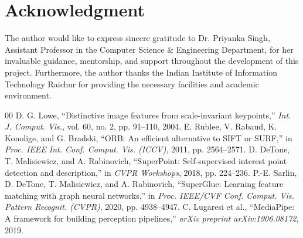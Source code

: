 \documentclass[conference]{IEEEtran}
\begin{document}
\section*{Acknowledgment}
The author would like to express sincere gratitude to Dr. Priyanka Singh, Assistant Professor in the Computer Science \& Engineering Department, for her invaluable guidance, mentorship, and support throughout the development of this project. Furthermore, the author thanks the Indian Institute of Information Technology Raichur for providing the necessary facilities and academic environment.


\begin{thebibliography}{00}
 D. G. Lowe, ``Distinctive image features from scale-invariant keypoints,'' \textit{Int. J. Comput. Vis.}, vol. 60, no. 2, pp. 91--110, 2004.
 E. Rublee, V. Rabaud, K. Konolige, and G. Bradski, ``ORB: An efficient alternative to SIFT or SURF,'' in \textit{Proc. IEEE Int. Conf. Comput. Vis. (ICCV)}, 2011, pp. 2564--2571.
 D. DeTone, T. Malisiewicz, and A. Rabinovich, ``SuperPoint: Self-supervised interest point detection and description,'' in \textit{CVPR Workshops}, 2018, pp. 224--236.
 P.-E. Sarlin, D. DeTone, T. Malisiewicz, and A. Rabinovich, ``SuperGlue: Learning feature matching with graph neural networks,'' in \textit{Proc. IEEE/CVF Conf. Comput. Vis. Pattern Recognit. (CVPR)}, 2020, pp. 4938--4947.
 C. Lugaresi et al., ``MediaPipe: A framework for building perception pipelines,'' \textit{arXiv preprint arXiv:1906.08172}, 2019.
\end{thebibliography}
\end{document}
